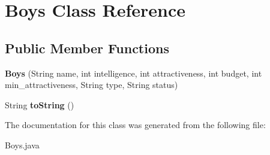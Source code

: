 \hypertarget{class_boys}{}\section{Boys Class Reference}
\label{class_boys}
\subsection*{Public Member Functions}
\begin{DoxyCompactItemize}
\item 
\mbox{\label{class_boys_a1e6ed13adfa3d3891b532ed9eadabdf0}} 
{\bfseries Boys} (String name, int intelligence, int attractiveness, int budget, int min\+\_\+attractiveness, String type, String status)
\item 
\mbox{\label{class_boys_a319b75b46da843f4a490a30662dd8f8d}} 
String {\bfseries to\+String} ()
\end{DoxyCompactItemize}


The documentation for this class was generated from the following file\+:\begin{DoxyCompactItemize}
\item 
Boys.\+java\end{DoxyCompactItemize}
